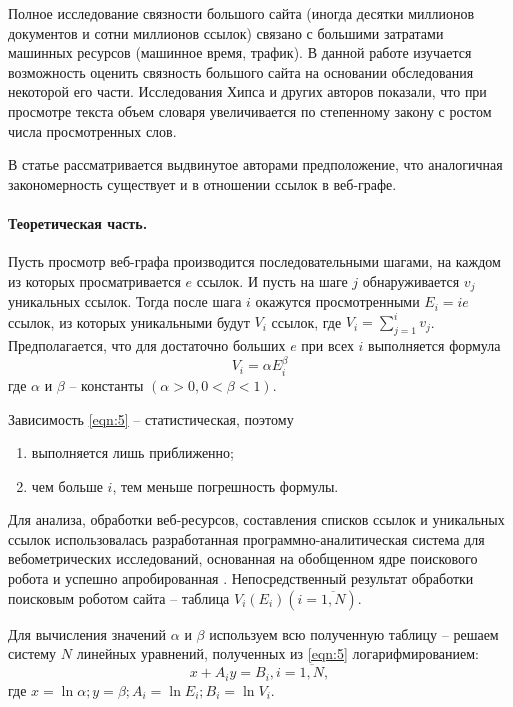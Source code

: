 Полное исследование связности большого сайта (иногда десятки миллионов документов и сотни миллионов ссылок) связано с большими затратами машинных ресурсов (машинное время, трафик). В данной работе изучается возможность оценить связность большого сайта на основании обследования некоторой его части. Исследования Хипса \cite{Heaps} и других авторов \cite{GelbukhSidorov,Zhang,KuboSatoMatsubara} показали, что при просмотре текста объем словаря увеличивается по степенному закону с ростом числа просмотренных слов.

В статье рассматривается выдвинутое авторами предположение, что аналогичная закономерность существует и в отношении ссылок в веб-графе.

\paragraph{Теоретическая часть.} Пусть просмотр веб-графа производится последовательными шагами, на каждом из которых просматривается \(e\) ссылок. И пусть на шаге \(j\) обнаруживается \(v_j\) уникальных ссылок. Тогда после шага \(i\) окажутся просмотренными \(E_i = ie\) ссылок, из которых уникальными будут \(V_i\) ссылок, где \(V_i = \sum_{j=1}^{i} v_j\). Предполагается, что для достаточно больших \(e\) при всех \(i\) выполняется формула
\begin{equation}
	\label{eqn:5}
	V_i = \alpha E_i^\beta
\end{equation}
где \(\alpha\) и \(\beta\) -- константы \((\alpha > 0, 0 < \beta < 1)\).

Зависимость \cref{eqn:5} -- статистическая, поэтому
\begin{enumerate}
	\item выполняется лишь приближенно;
	\item чем больше \(i\), тем меньше погрешность формулы.
\end{enumerate}

Для анализа, обработки веб-ресурсов, составления списков ссылок и уникальных
ссылок использовалась разработанная программно-аналитическая система для вебометрических исследований, основанная на обобщенном ядре поискового робота \cite{BlekanovSergeevMartynenko} и успешно апробированная \cite{MaksimovBlekanov,BlekanovSergeevMaksimovBOWTIE}. Непосредственный результат обработки поисковым роботом сайта -- таблица \(V_i (E_i) (i = \overline{1,N})\).

Для вычисления значений \(\alpha\) и \(\beta\) используем всю полученную таблицу -- решаем систему \(N\) линейных уравнений, полученных из \cref{eqn:5} логарифмированием:
\begin{equation}
	\label{eqn:6}
	x + A_i y = B_i, i = \overline{1,N},
\end{equation} где \(x = \ln{\alpha}; y = \beta; A_i = \ln{E_i}; B_i = \ln{V_i}\).

